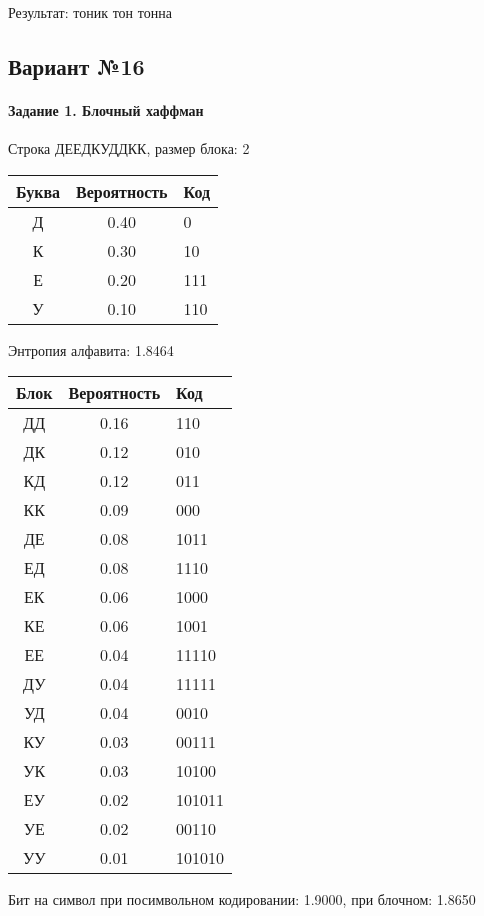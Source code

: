 \documentclass[a4paper, 12pt]{article}
\begin{document}
Результат: тоник тон тонна
\pagebreak
\subsection{Вариант №16}
\paragraph{Задание 1. Блочный хаффман \\}

Строка ДЕЕДКУДДКК, размер блока: 2
\begin{center}
 \begin{tabular}{ |c|c|l| } 
  \hline
     Буква & Вероятность & Код\\ \hline
Д & 0.40 & 0\\\hline
К & 0.30 & 10\\\hline
Е & 0.20 & 111\\\hline
У & 0.10 & 110
\\ \hline \end{tabular}
\end{center}
Энтропия алфавита: 1.8464
\begin{center}
 \begin{tabular}{ |c|c|l| } 
  \hline
     Блок & Вероятность & Код\\ \hline
ДД & 0.16 & 110\\\hline
ДК & 0.12 & 010\\\hline
КД & 0.12 & 011\\\hline
КК & 0.09 & 000\\\hline
ДЕ & 0.08 & 1011\\\hline
ЕД & 0.08 & 1110\\\hline
ЕК & 0.06 & 1000\\\hline
КЕ & 0.06 & 1001\\\hline
ЕЕ & 0.04 & 11110\\\hline
ДУ & 0.04 & 11111\\\hline
УД & 0.04 & 0010\\\hline
КУ & 0.03 & 00111\\\hline
УК & 0.03 & 10100\\\hline
ЕУ & 0.02 & 101011\\\hline
УЕ & 0.02 & 00110\\\hline
УУ & 0.01 & 101010
\\ \hline \end{tabular}
\end{center}
Бит на символ при посимвольном кодировании: 1.9000, при блочном: 1.8650
\end{document}
